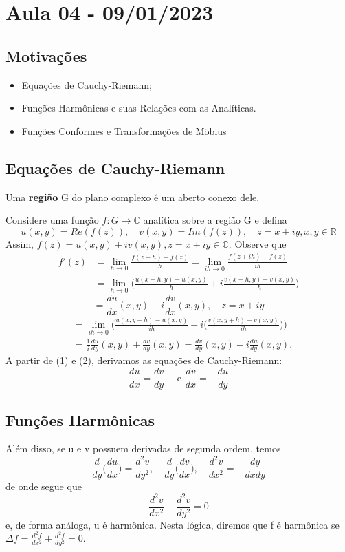 \documentclass[ComplexAnalysis/complex.tex]{subfiles}
\begin{document}
\section{Aula 04 - 09/01/2023}
\subsection{Motivações}
\begin{itemize}
	\item Equações de Cauchy-Riemann;
	\item Funções Harm\^onicas e suas Relações com as Analíticas.
	\item Funções Conformes e Transformações de M\"{o}bius
\end{itemize}
\subsection{Equações de Cauchy-Riemann}
\begin{def*}
	Uma \textbf{região} G do plano complexo é um aberto conexo dele.
\end{def*}
Considere uma função $f:G\rightarrow \mathbb{C}$ analítica sobre a região G e defina
$$
	u(x, y) = Re(f(z)), \quad v(x, y) = Im(f(z)), \quad z=x+iy, x, y\in \mathbb{R}
$$
Assim, $f(z) = u(x, y) + iv(x, y), z=x+iy\in \mathbb{C}.$ Observe que
\begin{align*}
	f'(z) & = \lim _{h\to{0}}\frac{f(z+h) - f(z)}{h} = \lim _{ih\to{0}}\frac{f(z+ih) - f(z)}{ih}            \\
	      & = \lim _{h\to{0}}\biggl(\frac{u(x+h, y) - u(x, y)}{h} + i\frac{v(x + h, y) - v(x, y)}{h}\biggr)
\end{align*}
\begin{equation}
	= \frac{du}{dx}(x, y) + i \frac{dv}{dx}(x, y), \quad z = x + iy
\end{equation}
\begin{align}
	 & = \lim _{ih\to{0}}\biggl(\frac{u(x, y+h) - u(x, y)}{ih} + i\biggl(\frac{v(x, y+h) - v(x, y)}{ih}\biggr)\biggr) \nonumber \\
	 & = \frac{1}{i}\frac{du}{dy}(x, y) + \frac{dv}{dy}(x, y) = \frac{dv}{dy}(x, y) - i \frac{du}{dy}(x, y).
\end{align}
A partir de (1) e (2), derivamos as equações de Cauchy-Riemann:
$$
	\boxed{\frac{du}{dx}=\frac{dv}{dy} \quad \text{ e } \frac{dv}{dx} = -\frac{du}{dy}}
$$
\subsection{Funções Harm\^onicas}
Além disso, se u e v possuem derivadas de segunda ordem, temos
$$
	\frac{d}{dy}\biggl(\frac{du}{dx}\biggr) = \frac{d^2v}{dy^2}, \quad \frac{d}{dy}\biggl(\frac{dv}{dx}\biggr), \quad \frac{d^2v}{dx^2} = -\frac{dy}{dxdy}
$$
de onde segue que
$$
	\frac{d^2v}{dx^2} + \frac{d^2v}{dy^2} = 0
$$
e, de forma análoga, u é harm\^onica. Nesta lógica, diremos que f é harm\^onica
se $\Delta f = \frac{d^2f}{dx^2} + \frac{d^2f}{dy^2} = 0.$
\end{document}
